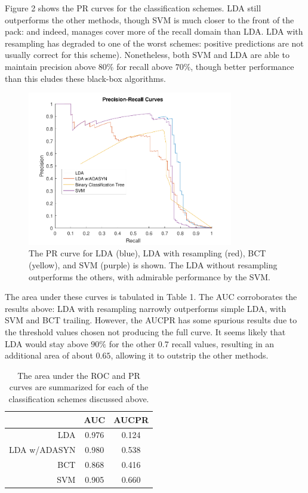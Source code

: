\documentclass{article}
\begin{document}
Figure 2 shows the PR curves for the classification schemes. LDA still outperforms the other methods, though SVM is much closer to the front of the pack: and indeed, manages cover more of the recall domain than LDA. LDA with resampling has degraded to one of the worst schemes: positive predictions are not usually correct for this scheme). Nonetheless, both SVM and LDA are able to maintain precision above $80\%$ for recall above $70\%$, though better performance than this eludes these black-box algorithms.
\begin{figure}[!htb]
	\centering
	\includegraphics[width=0.8\textwidth]{PR}
	\caption{The PR curve for LDA (blue), LDA with resampling (red), BCT (yellow), and SVM (purple) is shown. The LDA without resampling outperforms the others, with admirable performance by the SVM.}
	\label{fig:pr}
\end{figure}

The area under these curves is tabulated in Table 1. The AUC corroborates the results above: LDA with resampling narrowly outperforms simple LDA, with SVM and BCT trailing. However, the AUCPR has some spurious results due to the threshold values chosen not producing the full curve. It seems likely that LDA would stay above $90\%$ for the other $0.7$ recall values, resulting in an additional area of about $0.65$, allowing it to outstrip the other methods.
\begin{table}[!htb]
	\centering
	\caption{The area under the ROC and PR curves are summarized for each of the classification schemes discussed above.}
	\label{tab:area}
	\begin{tabular}{r|c|c}
		& AUC & AUCPR \\
		\hline
		LDA & 0.976 & 0.124 \\
		LDA w/ADASYN & 0.980 & 0.538 \\
		BCT  & 0.868 & 0.416 \\
		SVM & 0.905 & 0.660
	\end{tabular}
\end{table}
\end{document}
